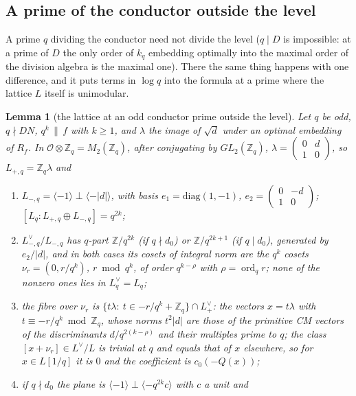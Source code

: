 \documentclass[11pt,reqno]{amsart}
\theoremstyle{plain}
\newtheorem{lemma}[theorem]{Lemma}
\theoremstyle{definition}
\DeclareMathOperator{\ord}{ord}
\newcommand{\Z}{\mathbb{Z}}
\newcommand{\Ldual}{L^{\vee}}
\newcommand{\Lp}{L_{+}}
\begin{document}
\subsection*{A prime of the conductor outside the level}

A prime $q$ dividing the conductor need not divide the level ($q\mid D$ is impossible: at a prime
of $D$ the only order of $k_q$ embedding optimally into the maximal order of the division algebra is
the maximal one). There the same thing happens with one difference, and it puts terms in $\log q$
into the formula at a prime where the lattice $L$ itself is unimodular.

\begin{lemma}[the lattice at an odd conductor prime outside the level]\label{lem:unimod}
Let $q$ be odd, $q\nmid DN$, $q^k\,\|\,f$ with $k\ge1$, and $\lambda$ the image of $\sqrt d$ under
an optimal embedding of $R_f$. In $\mathcal O\otimes\Z_q=M_2(\Z_q)$, after conjugating by
$GL_2(\Z_q)$, $\lambda=\begin{pmatrix}0&d\\1&0\end{pmatrix}$, so $L_{+,q}=\Z_q\lambda$ and
\begin{enumerate}
\item $L_{-,q}=\langle-1\rangle\perp\langle-\lvert d\rvert\rangle$, with basis $e_1=\mathrm{diag}
      (1,-1)$, $e_2=\begin{pmatrix}0&-d\\1&0\end{pmatrix}$; $[L_q:L_{+,q}\oplus L_{-,q}]=q^{2k}$;
\item $L_{-,q}^\vee/L_{-,q}$ has $q$-part $\Z/q^{2k}$ (if $q\nmid d_0$) or $\Z/q^{2k+1}$ (if
      $q\mid d_0$), generated by $e_2/\lvert d\rvert$, and in both cases its cosets of integral norm are
      the $q^k$ cosets $\nu_r=(0,r/q^k)$, $r\bmod q^k$, of order $q^{k-\rho}$ with $\rho=\ord_qr$;
      \emph{none} of the nonzero ones lies in $L_q^\vee=L_q$;
\item the fibre over $\nu_r$ is $\{t\lambda:\ t\in-r/q^k+\Z_q\}\cap\Lp^\vee$: the vectors
      $x=t\lambda$ with $t\equiv-r/q^k\bmod\Z_q$, whose norms $t^2\lvert d\rvert$ are those of the
      primitive CM vectors of the discriminants $d/q^{2(k-\rho)}$ and their multiples prime to $q$;
      the class $[x+\nu_r]\in\Ldual/L$ is trivial at $q$ and equals that of $x$ elsewhere, so for
      $x\in L[1/q]$ it is $0$ and the coefficient is $c_0(-Q(x))$;
\item if $q\nmid d_0$ the plane is $\langle-1\rangle\perp\langle-q^{2k}c\rangle$ with $c$ a unit and

\end{enumerate}
\end{lemma}
\end{document}
